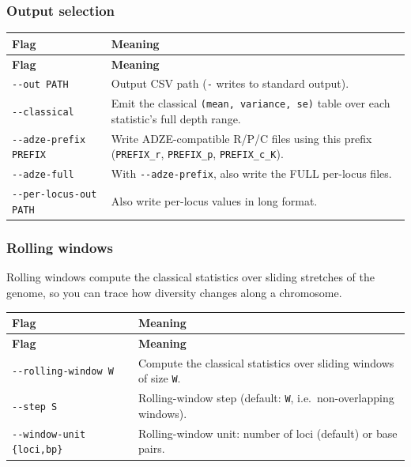 \documentclass[11pt]{article}
\begin{document}
\subsubsection*{Output selection}
\begin{longtable}{@{}>{\raggedright\arraybackslash}p{}>{\raggedright\arraybackslash}p{}@{}}
\toprule
\textbf{Flag} & \textbf{Meaning} \\
\midrule
\endfirsthead
\toprule
\textbf{Flag} & \textbf{Meaning} \\
\midrule
\endhead
\texttt{-{}-out PATH} & Output CSV path (\texttt{-} writes to standard output). \\
\texttt{-{}-classical} & Emit the classical \texttt{(mean, variance, se)} table over each statistic's full depth range. \\
\texttt{-{}-adze-prefix PREFIX} & Write ADZE-compatible R/P/C files using this prefix (\texttt{PREFIX\_r}, \texttt{PREFIX\_p}, \texttt{PREFIX\_c\_K}). \\
\texttt{-{}-adze-full} & With \texttt{-{}-adze-prefix}, also write the FULL per-locus files. \\
\texttt{-{}-per-locus-out PATH} & Also write per-locus values in long format. \\
\bottomrule
\end{longtable}

\subsubsection*{Rolling windows}

Rolling windows compute the classical statistics over sliding stretches of the
genome, so you can trace how diversity changes along a chromosome.
\begin{longtable}{@{}>{\raggedright\arraybackslash}p{}>{\raggedright\arraybackslash}p{}@{}}
\toprule
\textbf{Flag} & \textbf{Meaning} \\
\midrule
\endfirsthead
\toprule
\textbf{Flag} & \textbf{Meaning} \\
\midrule
\endhead
\texttt{-{}-rolling-window W} & Compute the classical statistics over sliding windows of size \texttt{W}. \\
\texttt{-{}-step S} & Rolling-window step (default: \texttt{W}, i.e.\ non-overlapping windows). \\
\texttt{-{}-window-unit \{loci,bp\}} & Rolling-window unit: number of loci (default) or base pairs. \\
\bottomrule
\end{longtable}
\end{document}
